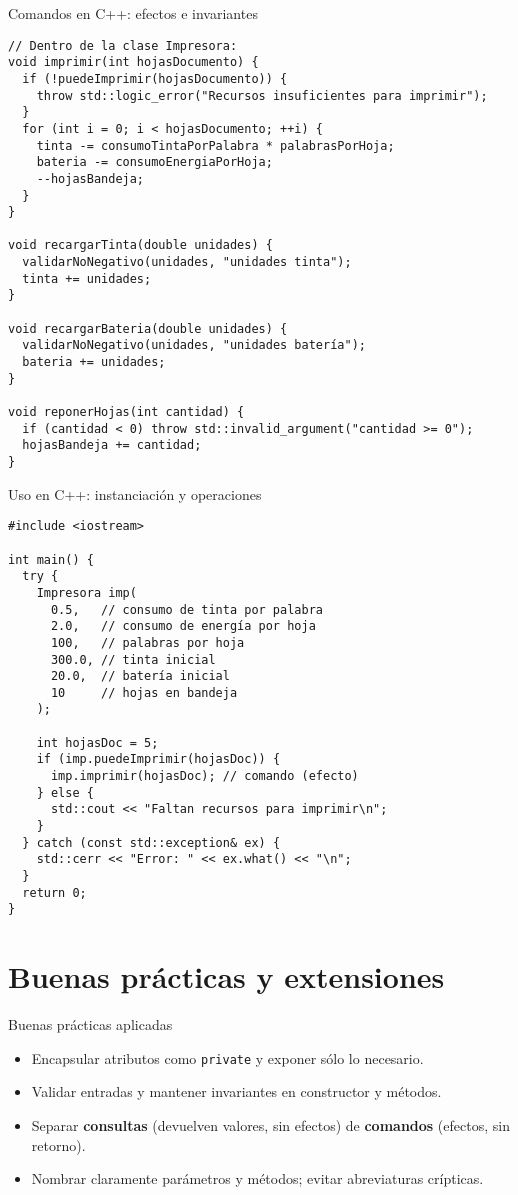 \documentclass[aspectratio=169]{beamer}
\begin{document}
\begin{frame}[fragile]{Comandos en C++: efectos e invariantes}
\lstset{style=cppstyle}
\begin{lstlisting}
// Dentro de la clase Impresora:
void imprimir(int hojasDocumento) {
  if (!puedeImprimir(hojasDocumento)) {
    throw std::logic_error("Recursos insuficientes para imprimir");
  }
  for (int i = 0; i < hojasDocumento; ++i) {
    tinta -= consumoTintaPorPalabra * palabrasPorHoja;
    bateria -= consumoEnergiaPorHoja;
    --hojasBandeja;
  }
}

void recargarTinta(double unidades) {
  validarNoNegativo(unidades, "unidades tinta");
  tinta += unidades;
}

void recargarBateria(double unidades) {
  validarNoNegativo(unidades, "unidades batería");
  bateria += unidades;
}

void reponerHojas(int cantidad) {
  if (cantidad < 0) throw std::invalid_argument("cantidad >= 0");
  hojasBandeja += cantidad;
}
\end{lstlisting}
\end{frame}

\begin{frame}[fragile]{Uso en C++: instanciación y operaciones}
\lstset{style=cppstyle}
\begin{lstlisting}
#include <iostream>

int main() {
  try {
    Impresora imp(
      0.5,   // consumo de tinta por palabra
      2.0,   // consumo de energía por hoja
      100,   // palabras por hoja
      300.0, // tinta inicial
      20.0,  // batería inicial
      10     // hojas en bandeja
    );

    int hojasDoc = 5;
    if (imp.puedeImprimir(hojasDoc)) {
      imp.imprimir(hojasDoc); // comando (efecto)
    } else {
      std::cout << "Faltan recursos para imprimir\n";
    }
  } catch (const std::exception& ex) {
    std::cerr << "Error: " << ex.what() << "\n";
  }
  return 0;
}
\end{lstlisting}
\end{frame}

\section{Buenas prácticas y extensiones}

\begin{frame}{Buenas prácticas aplicadas}
  \begin{itemize}
    \item Encapsular atributos como \texttt{private} y exponer sólo lo necesario.
    \item Validar entradas y mantener invariantes en constructor y métodos.
    \item Separar \textbf{consultas} (devuelven valores, sin efectos) de \textbf{comandos} (efectos, sin retorno).
    \item Nombrar claramente parámetros y métodos; evitar abreviaturas crípticas.
  \end{itemize}
\end{frame}
\end{document}
